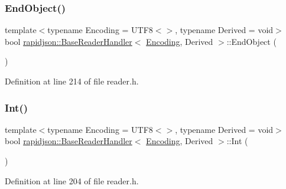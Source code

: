 \subsubsection{\texorpdfstring{EndObject()}{EndObject()}}
{\footnotesize\ttfamily template$<$typename Encoding = U\+T\+F8$<$$>$, typename Derived = void$>$ \\
bool \mbox{\hyperlink{structrapidjson_1_1_base_reader_handler}{rapidjson\+::\+Base\+Reader\+Handler}}$<$ \mbox{\hyperlink{classrapidjson_1_1_encoding}{Encoding}}, Derived $>$\+::End\+Object (\begin{DoxyParamCaption}\item[{\mbox{\hyperlink{namespacerapidjson_a44eb33eaa523e36d466b1ced64b85c84}{Size\+Type}}}]{ }\end{DoxyParamCaption})}



Definition at line 214 of file reader.\+h.


\begin{DoxyCode}{0}

\end{DoxyCode}
\mbox{\label{structrapidjson_1_1_base_reader_handler_a7de3a16b56209aa2aa56a42591c426cb}} 
\subsubsection{\texorpdfstring{Int()}{Int()}}
{\footnotesize\ttfamily template$<$typename Encoding = U\+T\+F8$<$$>$, typename Derived = void$>$ \\
bool \mbox{\hyperlink{structrapidjson_1_1_base_reader_handler}{rapidjson\+::\+Base\+Reader\+Handler}}$<$ \mbox{\hyperlink{classrapidjson_1_1_encoding}{Encoding}}, Derived $>$\+::Int (\begin{DoxyParamCaption}\item[{int}]{ }\end{DoxyParamCaption})}



Definition at line 204 of file reader.\+h.


\begin{DoxyCode}{0}

\end{DoxyCode}
\mbox{\label{structrapidjson_1_1_base_reader_handler_afb78023dc0f5a31f9c5d5de4a55d9077}} 
